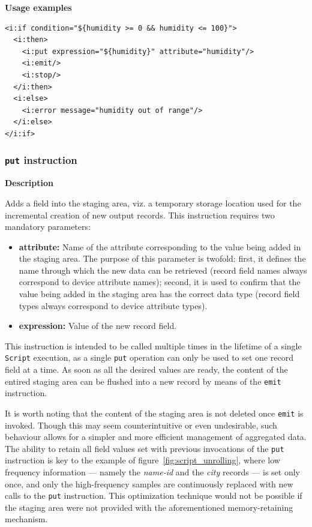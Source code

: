 \textbf{Usage examples}

\lstset{language=XML}
\begin{lstlisting}
<i:if condition="${humidity >= 0 && humidity <= 100}"> 
  <i:then>
    <i:put expression="${humidity}" attribute="humidity"/>
    <i:emit/>
    <i:stop/>
  </i:then>
  <i:else>
    <i:error message="humidity out of range"/>
  </i:else>
</i:if>
\end{lstlisting}


\subsubsection{\texttt{put} instruction}

\textbf{Description}

Adds a field into the staging area, viz. a temporary storage location used
for the incremental creation of new output records. This instruction requires
two mandatory parameters:

\begin{itemize}

    \item \textbf{attribute:} Name of the attribute corresponding to the value
        being added in the staging area. The purpose of this parameter is
        twofold: first, it defines the name through which the new data can be
        retrieved (record field names always correspond to device attribute
        names); second, it is used to confirm that the value being added in the
        staging area has the correct data type (record field types always
        correspond to device attribute types).

    \item \textbf{expression:} Value of the new record field.

\end{itemize}

This instruction is intended to be called multiple times in the lifetime of a
single \texttt{Script} execution, as a single \texttt{put} operation can only
be used to set one record field at a time. As soon as all the desired values
are ready, the content of the entired staging area can be flushed into a new
record by means of the \texttt{emit} instruction.

It is worth noting that the content of the staging area is not deleted once
\texttt{emit} is invoked. Though this may seem counterintuitive or even
undesirable, such behaviour allows for a simpler and more efficient management
of aggregated data. The ability to retain all field values set with previous
invocations of the \texttt{put} instruction is key to the example of
figure~\ref{fig:script_unrolling}, where low frequency information --- namely
the \textit{name-id} and the \textit{city} records --- is set only once, and
only the high-frequency samples are continuously replaced with new calls to the
\texttt{put} instruction. This optimization technique would not be possible if
the staging area were not provided with the aforementioned memory-retaining
mechanism.

